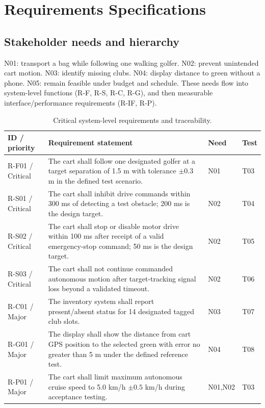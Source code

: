 \section{Requirements Specifications}
\subsection{Stakeholder needs and hierarchy}
N01: transport a bag while following one walking golfer. N02: prevent unintended cart motion. N03: identify missing clubs. N04: display distance to green without a phone. N05: remain feasible under budget and schedule. These needs flow into system-level functions (R-F, R-S, R-C, R-G), and then measurable interface/performance requirements (R-IF, R-P).
\begin{table}[ht]\centering\scriptsize\caption{Critical system-level requirements and traceability.}\begin{tabularx}{\linewidth}{p{.13\linewidth}X p{.11\linewidth}p{.13\linewidth}}\toprule ID / priority & Requirement statement & Need & Test\\\midrule
R-F01 / Critical & The cart shall follow one designated golfer at a target separation of 1.5 m with tolerance $\pm0.3$ m in the defined test scenario. & N01 & T03\\
R-S01 / Critical & The cart shall inhibit drive commands within 300 ms of detecting a test obstacle; 200 ms is the design target. & N02 & T04\\
R-S02 / Critical & The cart shall stop or disable motor drive within 100 ms after receipt of a valid emergency-stop command; 50 ms is the design target. & N02 & T05\\
R-S03 / Critical & The cart shall not continue commanded autonomous motion after target-tracking signal loss beyond a validated timeout. & N02 & T06\\
R-C01 / Major & The inventory system shall report present/absent status for 14 designated tagged club slots. & N03 & T07\\
R-G01 / Major & The display shall show the distance from cart GPS position to the selected green with error no greater than 5 m under the defined reference test. & N04 & T08\\
R-P01 / Major & The cart shall limit maximum autonomous cruise speed to 5.0 km/h $\pm0.5$ km/h during acceptance testing. & N01,N02 & T03\\
\bottomrule\end{tabularx}\end{table}
